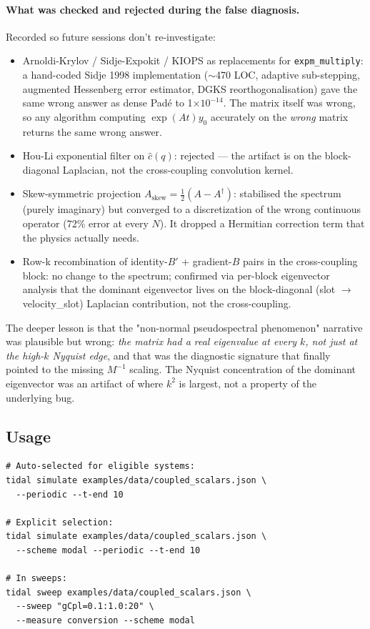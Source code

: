 \paragraph{What was checked and rejected during the false diagnosis.}
Recorded so future sessions don't re-investigate:
\begin{itemize}
  \item Arnoldi-Krylov / Sidje-Expokit / KIOPS as replacements for
    \texttt{expm\_multiply}: a hand-coded Sidje 1998 implementation
    ($\sim$470 LOC, adaptive sub-stepping, augmented Hessenberg error
    estimator, DGKS reorthogonalisation) gave the same wrong answer as
    dense Padé to 1$\times 10^{-14}$. The matrix itself was wrong,
    so any algorithm computing $\exp(A t) y_0$ accurately on the
    \emph{wrong} matrix returns the same wrong answer.
  \item Hou-Li exponential filter on $\widehat{c}(q)$: rejected — the
    artifact is on the block-diagonal Laplacian, not the
    cross-coupling convolution kernel.
  \item Skew-symmetric projection $A_{\mathrm{skew}} = \frac{1}{2}(A -
    A^\dagger)$: stabilised the spectrum (purely imaginary) but
    converged to a discretization of the wrong continuous operator
    (72\% error at every $N$). It dropped a Hermitian correction term
    that the physics actually needs.
  \item Row-k recombination of identity-$B'$ + gradient-$B$ pairs in
    the cross-coupling block: no change to the spectrum; confirmed
    via per-block eigenvector analysis that the dominant eigenvector
    lives on the block-diagonal (slot $\to$ velocity\_slot) Laplacian
    contribution, not the cross-coupling.
\end{itemize}
The deeper lesson is that the "non-normal pseudospectral phenomenon"
narrative was plausible but wrong: \emph{the matrix had a real
eigenvalue at every $k$, not just at the high-$k$ Nyquist edge}, and
that was the diagnostic signature that finally pointed to the missing
$M^{-1}$ scaling. The Nyquist concentration of the dominant
eigenvector was an artifact of where $k^2$ is largest, not a property
of the underlying bug.

\subsection{Usage}
\label{sec:modal-usage}

\begin{lstlisting}[style=bash]
# Auto-selected for eligible systems:
tidal simulate examples/data/coupled_scalars.json \
  --periodic --t-end 10

# Explicit selection:
tidal simulate examples/data/coupled_scalars.json \
  --scheme modal --periodic --t-end 10

# In sweeps:
tidal sweep examples/data/coupled_scalars.json \
  --sweep "gCpl=0.1:1.0:20" \
  --measure conversion --scheme modal
\end{lstlisting}

